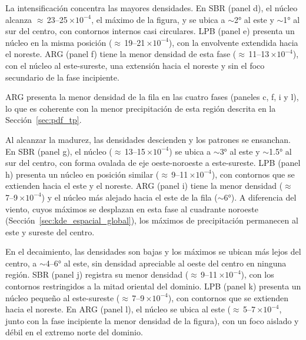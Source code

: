 La intensificación concentra las mayores densidades. En SBR (panel d), el núcleo alcanza ${\approx}$\,23--25\,$\times10^{-4}$, el máximo de la figura, y se ubica a ${\sim}$2° al este y ${\sim}$1° al sur del centro, con contornos internos casi circulares. LPB (panel e) presenta un núcleo en la misma posición (${\approx}$\,19--21\,$\times10^{-4}$), con la envolvente extendida hacia el noreste. ARG (panel f) tiene la menor densidad de esta fase (${\approx}$\,11--13\,$\times10^{-4}$), con el núcleo al este-sureste, una extensión hacia el noreste y sin el foco secundario de la fase incipiente.

ARG presenta la menor densidad de la fila en las cuatro fases (paneles c, f, i y l), lo que es coherente con la menor precipitación de esta región descrita en la Sección~\ref{sec:pdf_tp}.

Al alcanzar la madurez, las densidades descienden y los patrones se ensanchan. En SBR (panel g), el núcleo (${\approx}$\,13--15\,$\times10^{-4}$) se ubica a ${\sim}$3° al este y ${\sim}$1.5° al sur del centro, con forma ovalada de eje oeste-noroeste a este-sureste. LPB (panel h) presenta un núcleo en posición similar (${\approx}$\,9--11\,$\times10^{-4}$), con contornos que se extienden hacia el este y el noreste. ARG (panel i) tiene la menor densidad (${\approx}$\,7--9\,$\times10^{-4}$) y el núcleo más alejado hacia el este de la fila (${\sim}$6°). A diferencia del viento, cuyos máximos se desplazan en esta fase al cuadrante noroeste (Sección~\ref{sec:kde_espacial_global}), los máximos de precipitación permanecen al este y sureste del centro.

En el decaimiento, las densidades son bajas y los máximos se ubican más lejos del centro, a ${\sim}$4--6° al este, sin densidad apreciable al oeste del centro en ninguna región. SBR (panel j) registra su menor densidad (${\approx}$\,9--11\,$\times10^{-4}$), con los contornos restringidos a la mitad oriental del dominio. LPB (panel k) presenta un núcleo pequeño al este-sureste (${\approx}$\,7--9\,$\times10^{-4}$), con contornos que se extienden hacia el noreste. En ARG (panel l), el núcleo se ubica al este (${\approx}$\,5--7\,$\times10^{-4}$, junto con la fase incipiente la menor densidad de la figura), con un foco aislado y débil en el extremo norte del dominio.

